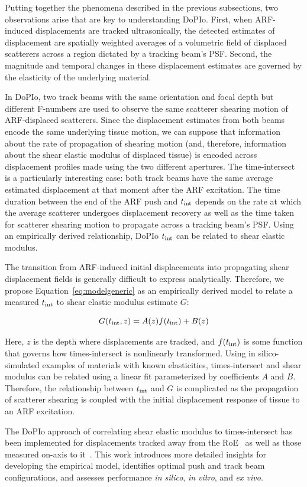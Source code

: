 Putting together the phenomena described in the previous subsections, two observations arise that are key to understanding DoPIo. First, when ARF-induced displacements are tracked ultrasonically, the detected estimates of displacement are spatially weighted averages of a volumetric field of displaced scatterers across a region dictated by a tracking beam's PSF. Second, the magnitude and temporal changes in these displacement estimates are governed by the elasticity of the underlying material.

In DoPIo, two track beams with the same orientation and focal depth but different F-numbers are used to observe the same scatterer shearing motion of ARF-displaced scatterers. Since the displacement estimates from both beams encode the same underlying tissue motion, we can suppose that information about the rate of propagation of shearing motion (and, therefore, information about the shear elastic modulus of displaced tissue) is encoded across displacement profiles made using the two different apertures. The time-intersect is a particularly interesting case: both track beams have the same average estimated displacement at that moment after the ARF excitation. The time duration between the end of the ARF push and $t_{\textnormal{int}}$ depends on the rate at which the average scatterer undergoes displacement recovery as well as the time taken for scatterer shearing motion to propagate across a tracking beam's PSF. Using an empirically derived relationship, DoPIo $t_{\textnormal{int}}$ can be related to shear elastic modulus.

The transition from ARF-induced initial displacements into propagating shear displacement fields is generally difficult to express analytically. Therefore, we propose Equation~\ref{eq:modelgeneric} as an empirically derived model to relate a measured $t_{\textnormal{int}}$ to shear elastic modulus estimate $G$:

\begin{equation}
G(t_{\textnormal{int}}, z) = A(z) f(t_{\textnormal{int}}) + B(z)
\label{eq:modelgeneric}
\end{equation}

\noindent{}Here, $z$ is the depth where displacements are tracked, and $f(t_{\textnormal{int}})$ is some function that governs how times-intersect is nonlinearly transformed. Using in silico-simulated examples of materials with known elasticities, times-intersect and shear modulus can be related using a linear fit parameterized by coefficients $A$ and $B$. Therefore, the relationship between $t_{\textnormal{int}}$ and $G$ is complicated as the propagation of scatterer shearing is coupled with the initial displacement response of tissue to an ARF excitation.

The DoPIo approach of correlating shear elastic modulus to times-intersect has been implemented for displacements tracked away from the RoE~\cite{yokoyama_Doubleprofile_2019} as well as those measured on-axis to it~\cite{yokoyama_Blind_2020,yokoyama_Assessing_2021}. This work introduces more detailed insights for developing the empirical model, identifies optimal push and track beam configurations, and assesses performance \emph{in silico}, \emph{in vitro}, and \emph{ex vivo}.
